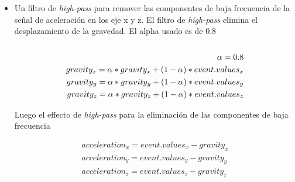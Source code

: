 \begin{itemize}
	\item  Un filtro de \emph{high-pass} para remover las componentes de baja frecuencia de la señal de aceleración en los eje x y z.  El filtro de \emph{high-pass}
		elimina el desplazamiento de la gravedad. El alpha usado es de 0.8 \\\\
	\begin{align*}
		\alpha = 0.8 \\
		gravity_{x} = \alpha * gravity_x + (1-\alpha) *event.values_{x} \notag\\
		gravity_{y} = \alpha * gravity_y + (1-\alpha) *event.values_{y} \notag\\
		gravity_{z} = \alpha * gravity_z + (1-\alpha) *event.values_{z} \notag\\	
	\end{align*}
			
	Luego el effecto de \emph{high-pass} para la eliminación de las componentes de baja frecuencia
	
	\begin{align*}
		acceleration_{x} =  event.values_{x} - gravity_{x}\\
		acceleration_{y} = event.values_{y} - gravity_{y}\\
		acceleration_{z} = event.values_{z} - gravity_{z}
	\end{align*}


\end{itemize}
